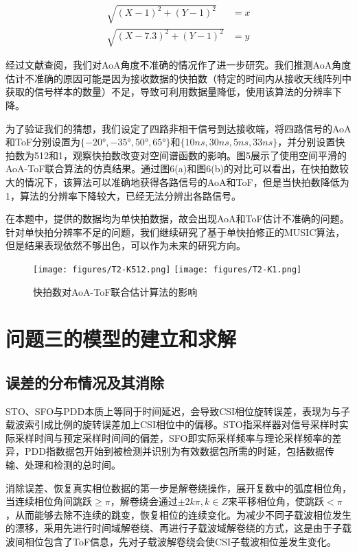\documentclass[withoutpreface,bwprint]{cumcmthesis}
\begin{document}
\begin{align}
\sqrt{(X - 1)^2 + (Y - 1)^2} &= x \\
\sqrt{(X - 7.3)^2 + (Y - 1)^2} &= y
\end{align}

经过文献查阅，我们对AoA角度不准确的情况作了进一步研究。我们推测AoA角度估计不准确的原因可能是因为接收数据的快拍数（特定的时间内从接收天线阵列中获取的信号样本的数量）不足，导致可利用数据量降低，使用该算法的分辨率下降。

为了验证我们的猜想，我们设定了四路非相干信号到达接收端，将四路信号的AoA和ToF分别设置为$\{-20°,-35°,50°,65°\}$和$\{10ns, 30ns, 5ns, 33ns\}$，并分别设置快拍数为512和1，观察快拍数改变对空间谱函数的影响。图5展示了使用空间平滑的AoA-ToF联合算法的仿真结果。通过图6(a)和图6(b)的对比可以看出，在快拍数较大的情况下，该算法可以准确地获得各路信号的AoA和ToF，但是当快拍数降低为1，算法的分辨率下降较大，已经无法分辨出各路信号。

在本题中，提供的数据均为单快拍数据，故会出现AoA和ToF估计不准确的问题。针对单快拍分辨率不足的问题，我们继续研究了基于单快拍修正的MUSIC算法，但是结果表现依然不够出色，可以作为未来的研究方向。
\begin{figure}
\centering
{}
{\texttt{[image: figures/T2-K512.png]}}
{\texttt{[image: figures/T2-K1.png]}}
\caption{快拍数对AoA-ToF联合估计算法的影响}\label{fig:快拍}
\end{figure} 

\newpage
\section{问题三的模型的建立和求解}
\subsection{误差的分布情况及其消除}
STO、SFO与PDD本质上等同于时间延迟，会导致CSI相位旋转误差，表现为与子载波索引成比例的旋转误差加上CSI相位中的偏移。STO指采样器对信号采样时实际采样时间与预定采样时间间的偏差，SFO即实际采样频率与理论采样频率的差异，PDD指数据包开始到被检测并识别为有效数据包所需的时延，包括数据传输、处理和检测的总时间。

消除误差、恢复真实相位数据的第一步是解卷绕操作，展开复数中的弧度相位角，当连续相位角间跳跃$\geq\pi$，解卷绕会通过$\pm 2k\pi,k\in Z$来平移相位角，使跳跃$<\pi$，从而能够去除不连续的跳变，恢复相位的连续变化。为减少不同子载波相位发生的漂移，采用先进行时间域解卷绕、再进行子载波域解卷绕的方式，这是由于子载波间相位包含了ToF信息，先对子载波解卷绕会使CSI子载波相位差发生变化。
\end{document}
